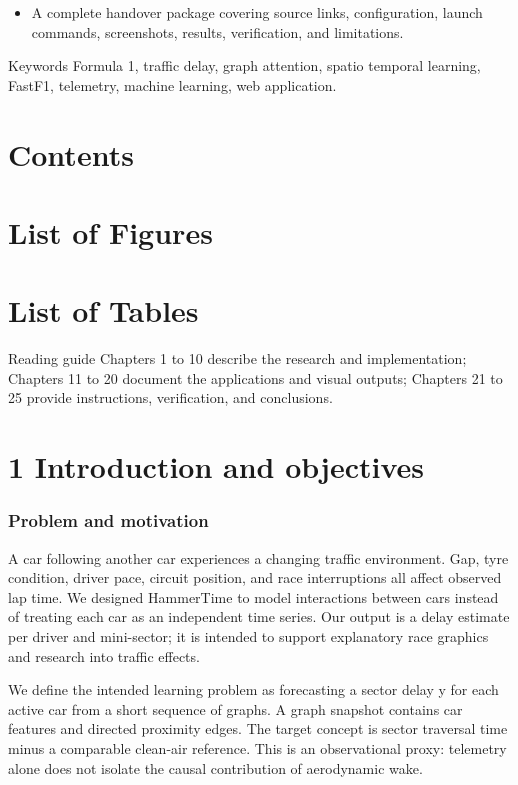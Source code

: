 \documentclass[11pt,a4paper,oneside]{report}
\begin{document}
\begin{itemize}[leftmargin=2em]\item A complete handover package covering source links, configuration, launch commands, screenshots, results, verification, and limitations.\end{itemize}

Keywords  Formula 1, traffic delay, graph attention, spatio temporal learning, FastF1, telemetry, machine learning, web application.

\clearpage

\clearpage\chapter*{Contents}\tableofcontents\clearpage\chapter*{List of Figures}\listoffigures\clearpage\chapter*{List of Tables}\listoftables\clearpage

Reading guide  Chapters 1 to 10 describe the research and implementation; Chapters 11 to 20 document the applications and visual outputs; Chapters 21 to 25 provide instructions, verification, and conclusions.

\clearpage

\clearpage\chapter*{1 Introduction and objectives}

\subsection*{Problem and motivation}

A car following another car experiences a changing traffic environment. Gap, tyre condition, driver pace, circuit position, and race interruptions all affect observed lap time. We designed HammerTime to model interactions between cars instead of treating each car as an independent time series. Our output is a delay estimate per driver and mini-sector; it is intended to support explanatory race graphics and research into traffic effects.

We define the intended learning problem as forecasting a sector delay y for each active car from a short sequence of graphs. A graph snapshot contains car features and directed proximity edges. The target concept is sector traversal time minus a comparable clean-air reference. This is an observational proxy: telemetry alone does not isolate the causal contribution of aerodynamic wake.
\end{document}
